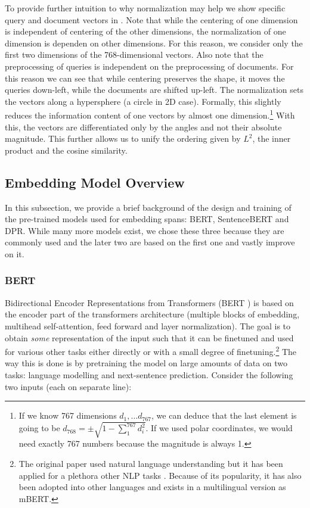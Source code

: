 To provide further intuition to why normalization may help we show specific query and document vectors in .
Note that while the centering of one dimension is independent of centering of the other dimensions, the normalization of one dimension is dependen on other dimensions.
For this reason, we consider only the first two dimensions of the 768-dimensional vectors.
Also note that the preprocessing of queries is independent on the preprocessing of documents.
For this reason we can see that while centering preserves the shape, it moves the queries down-left, while the documents are shifted up-left.
The normalization sets the vectors along a hypersphere (a circle in 2D case).
Formally, this slightly reduces the information content of one vectors by almost one dimension.\footnote{If we know 767 dimensions $d_1, \ldots d_{767}$, we can deduce that the last element is going to be $d_{768} = \pm \sqrt{1-\sum_1^{767} d_i^2}$. If we used polar coordinates, we would need exactly 767 numbers because the magnitude is always 1.}
With this, the vectors are differentiated only by the angles and not their absolute magnitude.
This further allows us to unify the ordering given by $L^2$, the inner product and the cosine similarity.

\subsection{Embedding Model Overview} \label{subsec:embd_model_overview}

In this subsection, we provide a brief background of the design and training of the pre-trained models used for embedding spans: BERT, SentenceBERT and DPR.
While many more models exist, we chose these three because they are commonly used and the later two are based on the first one and vastly improve on it.

\subsubsection{BERT}

Bidirectional Encoder Representations from Transformers (BERT \citep{bert}) is based on the encoder part of the transformers \citep{vaswani2017attention} architecture (multiple blocks of embedding, multihead self-attention, feed forward and layer normalization).
The goal is to obtain \emph{some} representation of the input such that it can be finetuned and used for various other tasks either directly or with a small degree of finetuning.\footnote{The original paper used natural language understanding but it has been applied for a plethora other NLP tasks \citep{qu2019bert,yang2020bert,kaliyar2021fakebert,liu2019fine,liu2019text,hakala2019biomedical,rongali2020don,he2020establishing,gao2019target,munikar2019fine}. Because of its popularity, it has also been adopted into other languages \citep{delobelle2020robbert,chan2020german,sido2021czert,cui2021pre,virtanen2019multilingual,wang2020extending,dumitrescu2020birth,de2019bertje} and exists in a multilingual version as mBERT.}
The way this is done is by pretraining the model on large amounts of data on two tasks: language modelling and next-sentence prediction.
Consider the following two inputs (each on separate line):

